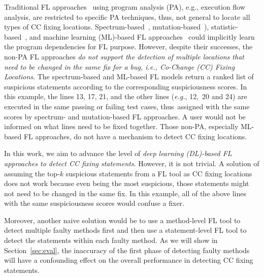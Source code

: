 Traditional FL approaches~\cite{zhang-fse09,ICICA-10} using program
analysis (PA), e.g., execution flow analysis, are restricted to
specific PA techniques, thus, not general to locate all types of CC
fixing locations.
Spectrum-based~\cite{jones2005empirical,abreu2006evaluation},
mutation-based~\cite{MUSE,papadakis2012using,Metallaxis}),
statistic-based~\cite{liblit-pldi05}, and machine learning (ML)-based
FL approaches~\cite{DeepFL,icse21-fl} could implicitly learn the
program dependencies for FL purpose. However, despite their successes,
the non-PA FL approaches {\em do not support the detection of multiple
  locations that need to be changed in the same fix for a bug, i.e.,
  Co-Change (CC) Fixing Locations}.
%
The spectrum-based and ML-based FL models return a ranked list of
suspicious statements according to the corresponding suspiciousness
scores. In this example, the lines 13, 17, 21, and the other lines
({\em e.g.}, 12,~20 and 24) are executed in the same passing or
failing test cases, thus~assigned with the same scores by
spectrum- and mutation-based FL approaches. A user would not be
informed on what lines need to be fixed together. Those non-PA,
especially ML-based FL approaches, do not have a mechanism to detect CC
fixing locations.

In this work, we aim to advance the level of {\em deep learning
  (DL)-based FL approaches to detect CC fixing statements}. However,
it is not trivial. A solution of assuming the top-$k$ suspicious
statements from a FL tool as CC fixing locations does not work because
even being the most suspicious, those statements might not need to be
changed in the same fix. In this example, all of the above lines with
the same suspiciousness scores would confuse a fixer.

Moreover, another naive solution would be to use a method-level FL
tool to detect multiple faulty methods first and then use a
statement-level FL tool to detect the statements within each faulty
method. As we will show in Section~\ref{sec:eval}, the inaccuracy of
the first phase of detecting faulty methods will have a confounding
effect on the overall performance in detecting CC fixing statements.


